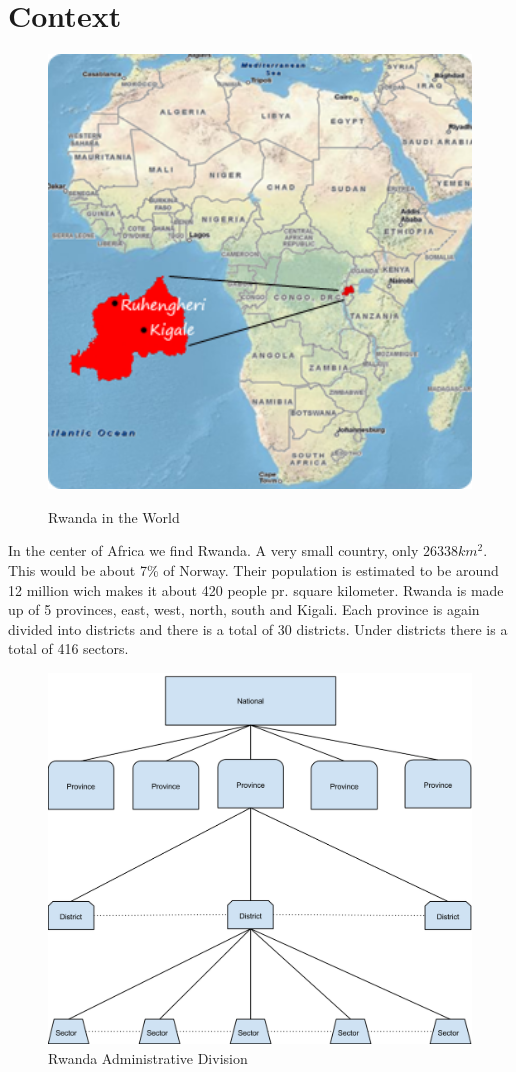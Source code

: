 \chapter{Context}
\begin{figure}
\centering
\includegraphics[width=12cm]{empirical/images/context_map_rwanda}
\label{context_map_of_rwanda}
\caption{Rwanda in the World \cite{14}}
\end{figure}
In the center of Africa we find Rwanda. A very small country, only \(26338 km^2\). This would be about 7\% of Norway. 
Their population is estimated to be around 12 million wich makes it about 420 people pr. square kilometer. 
Rwanda is made up of 5 provinces, east, west, north, south and Kigali. 
Each province is again divided into districts and there is a total of 30 districts. Under districts there is a total of 416 sectors\cite{1}.
\begin{figure}
\centering
\includegraphics[width=12cm]{empirical/images/rwanda_administrative_division}
\caption{Rwanda Administrative Division}
\end{figure}
